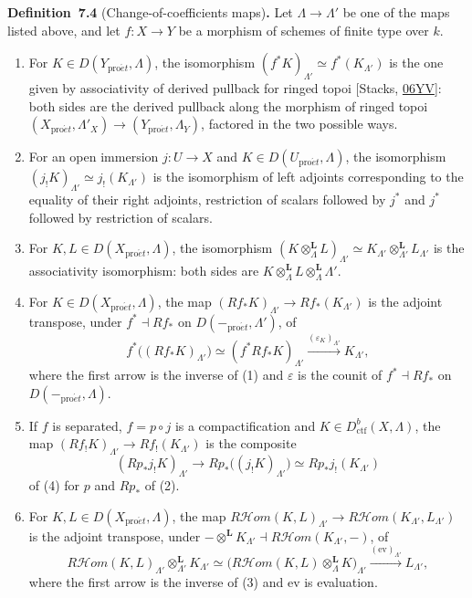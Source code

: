\documentclass[11pt]{article}
\newenvironment{bpstatement}[2]{\par\addvspace{0.6\baselineskip}\noindent\textbf{#1}#2\textbf{.}\enspace\ignorespaces}
  {\par\addvspace{0.4\baselineskip}}
\providecommand{\cHom}{}\renewcommand{\cHom}{R\mathcal{H}\!om}
\begin{document}
\label{bp612}%
\begin{bpstatement}{Definition~7.4}{ (Change-of-coefficients maps)}
Let \(\Lambda\to\Lambda'\) be one of the maps listed above, and let \(f:X\to Y\) be a morphism of schemes of finite type over \(k\).

\begin{enumerate}
\item For \(K\in D(Y_{\mathrm{pro}\acute{e}t},\Lambda)\), the isomorphism \((f^*K)_{\Lambda'}\simeq f^*(K_{\Lambda'})\) is the one given by associativity of derived pullback for ringed topoi [Stacks, \href{https://stacks.math.columbia.edu/tag/06YV}{06YV}]: both sides are the derived pullback along the morphism of ringed topoi \((X_{\mathrm{pro}\acute{e}t},\Lambda'_X)\to(Y_{\mathrm{pro}\acute{e}t},\Lambda_Y)\), factored in the two possible ways.
\item For an open immersion \(j:U\to X\) and \(K\in D(U_{\mathrm{pro}\acute{e}t},\Lambda)\), the isomorphism \((j_!K)_{\Lambda'}\simeq j_!(K_{\Lambda'})\) is the isomorphism of left adjoints corresponding to the equality of their right adjoints, restriction of scalars followed by \(j^*\) and \(j^*\) followed by restriction of scalars.
\item For \(K,L\in D(X_{\mathrm{pro}\acute{e}t},\Lambda)\), the isomorphism \((K\otimes^{\mathbf L}_\Lambda L)_{\Lambda'}\simeq
  K_{\Lambda'}\otimes^{\mathbf L}_{\Lambda'}L_{\Lambda'}\) is the associativity isomorphism: both sides are \(K\otimes^{\mathbf L}_\Lambda L\otimes^{\mathbf L}_\Lambda\Lambda'\).
\item For \(K\in D(X_{\mathrm{pro}\acute{e}t},\Lambda)\), the map \((Rf_*K)_{\Lambda'}\to Rf_*(K_{\Lambda'})\) is the adjoint transpose, under \(f^*\dashv Rf_*\) on \(D(-_{\mathrm{pro}\acute{e}t},\Lambda')\), of \[
   f^*\bigl((Rf_*K)_{\Lambda'}\bigr)\simeq(f^*Rf_*K)_{\Lambda'}
   \xrightarrow{(\varepsilon_K)_{\Lambda'}}K_{\Lambda'},
   \] where the first arrow is the inverse of (1) and \(\varepsilon\) is the counit of \(f^*\dashv Rf_*\) on \(D(-_{\mathrm{pro}\acute{e}t},\Lambda)\).
\item If \(f\) is separated, \(f=p\circ j\) is a compactification and \(K\in D^b_{\mathrm{ctf}}(X,\Lambda)\), the map \((Rf_!K)_{\Lambda'}\to Rf_!(K_{\Lambda'})\) is the composite \[
   (Rp_*j_!K)_{\Lambda'}\longrightarrow Rp_*\bigl((j_!K)_{\Lambda'}\bigr)
   \simeq Rp_*j_!(K_{\Lambda'})
   \] of (4) for \(p\) and \(Rp_*\) of (2).
\item For \(K,L\in D(X_{\mathrm{pro}\acute{e}t},\Lambda)\), the map \(\cHom(K,L)_{\Lambda'}\to\cHom(K_{\Lambda'},L_{\Lambda'})\) is the adjoint transpose, under \(-\otimes^{\mathbf L}K_{\Lambda'}\dashv
  \cHom(K_{\Lambda'},-)\), of \[
   \cHom(K,L)_{\Lambda'}\otimes^{\mathbf L}_{\Lambda'}K_{\Lambda'}
   \simeq\bigl(\cHom(K,L)\otimes^{\mathbf L}_\Lambda K\bigr)_{\Lambda'}
   \xrightarrow{(\mathrm{ev})_{\Lambda'}}L_{\Lambda'},
   \] where the first arrow is the inverse of (3) and \(\mathrm{ev}\) is evaluation.
\end{enumerate}
\end{bpstatement}
\end{document}
